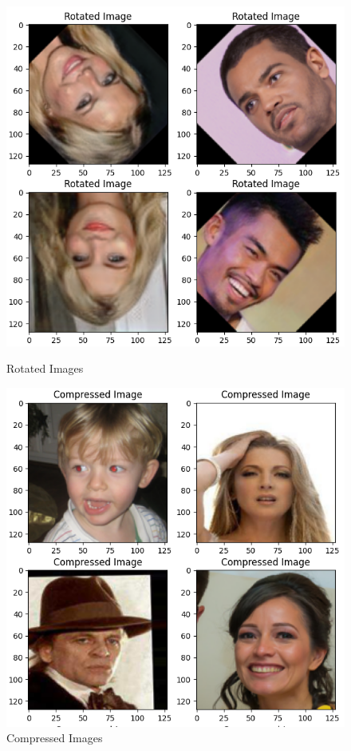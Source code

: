 	\begin{figure}[hbt!]
		\centering
		\begin{minipage}{0.45\textwidth}
				\centering
				\includegraphics[width=0.95\linewidth]{./img/rotated.png}
				\caption{Rotated Images}
		\end{minipage}
		\hfill
		\begin{minipage}{0.45\textwidth}
				\centering
				\includegraphics[width=0.95\linewidth]{./img/compressed.png}
				\caption{Compressed Images}
		\end{minipage}


\end{figure}
